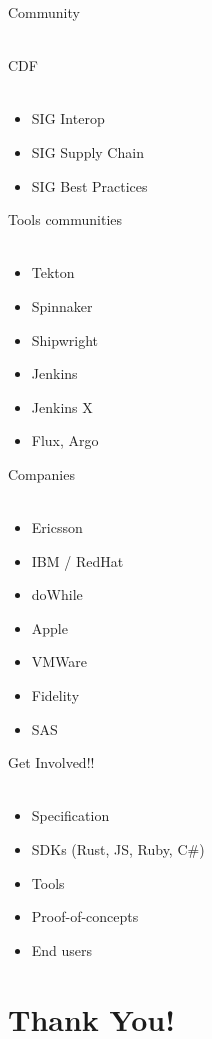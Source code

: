 \documentclass[aspectratio=169,11pt,hyperref={colorlinks=true}]{beamer}
\begin{document}
\begin{stripedframe}%
  {%
  Community
  ~ \\
  ~ \\
  }%
  {%
  CDF \\
  ~
  \begin{itemize}
    \item SIG Interop
    \item SIG Supply Chain
    \item SIG Best Practices
  \end{itemize}
  }%
  {%
  Tools communities \\
  ~
  \begin{itemize}
    \item Tekton
    \item Spinnaker
    \item Shipwright
    \item Jenkins
    \item Jenkins X
    \item Flux, Argo
  \end{itemize}
  }%
  {%
  Companies \\
  ~
  \begin{itemize}
    \item Ericsson
    \item IBM / RedHat
    \item doWhile
    \item Apple
    \item VMWare
    \item Fidelity
    \item SAS
  \end{itemize}
  }%
  {%
  Get Involved!! \\
  ~
  \begin{itemize}
    \item Specification
    \item SDKs (Rust, JS, Ruby, C\#)
    \item Tools
    \item Proof-of-concepts
    \item End users
  \end{itemize}
  }%
\end{stripedframe}

\section[Thank You]{Thank You!}
\end{document}
